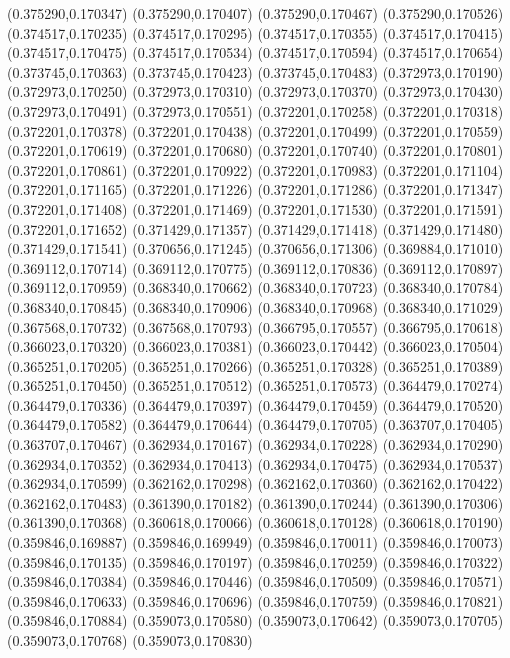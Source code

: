 (0.375290,0.170347)
(0.375290,0.170407)
(0.375290,0.170467)
(0.375290,0.170526)
(0.374517,0.170235)
(0.374517,0.170295)
(0.374517,0.170355)
(0.374517,0.170415)
(0.374517,0.170475)
(0.374517,0.170534)
(0.374517,0.170594)
(0.374517,0.170654)
(0.373745,0.170363)
(0.373745,0.170423)
(0.373745,0.170483)
(0.372973,0.170190)
(0.372973,0.170250)
(0.372973,0.170310)
(0.372973,0.170370)
(0.372973,0.170430)
(0.372973,0.170491)
(0.372973,0.170551)
(0.372201,0.170258)
(0.372201,0.170318)
(0.372201,0.170378)
(0.372201,0.170438)
(0.372201,0.170499)
(0.372201,0.170559)
(0.372201,0.170619)
(0.372201,0.170680)
(0.372201,0.170740)
(0.372201,0.170801)
(0.372201,0.170861)
(0.372201,0.170922)
(0.372201,0.170983)
(0.372201,0.171104)
(0.372201,0.171165)
(0.372201,0.171226)
(0.372201,0.171286)
(0.372201,0.171347)
(0.372201,0.171408)
(0.372201,0.171469)
(0.372201,0.171530)
(0.372201,0.171591)
(0.372201,0.171652)
(0.371429,0.171357)
(0.371429,0.171418)
(0.371429,0.171480)
(0.371429,0.171541)
(0.370656,0.171245)
(0.370656,0.171306)
(0.369884,0.171010)
(0.369112,0.170714)
(0.369112,0.170775)
(0.369112,0.170836)
(0.369112,0.170897)
(0.369112,0.170959)
(0.368340,0.170662)
(0.368340,0.170723)
(0.368340,0.170784)
(0.368340,0.170845)
(0.368340,0.170906)
(0.368340,0.170968)
(0.368340,0.171029)
(0.367568,0.170732)
(0.367568,0.170793)
(0.366795,0.170557)
(0.366795,0.170618)
(0.366023,0.170320)
(0.366023,0.170381)
(0.366023,0.170442)
(0.366023,0.170504)
(0.365251,0.170205)
(0.365251,0.170266)
(0.365251,0.170328)
(0.365251,0.170389)
(0.365251,0.170450)
(0.365251,0.170512)
(0.365251,0.170573)
(0.364479,0.170274)
(0.364479,0.170336)
(0.364479,0.170397)
(0.364479,0.170459)
(0.364479,0.170520)
(0.364479,0.170582)
(0.364479,0.170644)
(0.364479,0.170705)
(0.363707,0.170405)
(0.363707,0.170467)
(0.362934,0.170167)
(0.362934,0.170228)
(0.362934,0.170290)
(0.362934,0.170352)
(0.362934,0.170413)
(0.362934,0.170475)
(0.362934,0.170537)
(0.362934,0.170599)
(0.362162,0.170298)
(0.362162,0.170360)
(0.362162,0.170422)
(0.362162,0.170483)
(0.361390,0.170182)
(0.361390,0.170244)
(0.361390,0.170306)
(0.361390,0.170368)
(0.360618,0.170066)
(0.360618,0.170128)
(0.360618,0.170190)
(0.359846,0.169887)
(0.359846,0.169949)
(0.359846,0.170011)
(0.359846,0.170073)
(0.359846,0.170135)
(0.359846,0.170197)
(0.359846,0.170259)
(0.359846,0.170322)
(0.359846,0.170384)
(0.359846,0.170446)
(0.359846,0.170509)
(0.359846,0.170571)
(0.359846,0.170633)
(0.359846,0.170696)
(0.359846,0.170759)
(0.359846,0.170821)
(0.359846,0.170884)
(0.359073,0.170580)
(0.359073,0.170642)
(0.359073,0.170705)
(0.359073,0.170768)
(0.359073,0.170830)
